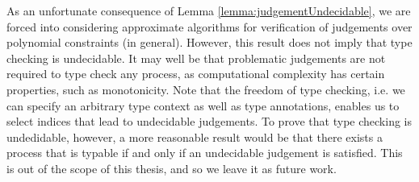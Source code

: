 As an unfortunate consequence of Lemma \ref{lemma:judgementUndecidable}, we are forced into considering approximate algorithms for verification of judgements over polynomial constraints (in general). However, this result does not imply that type checking is undecidable. It may well be that problematic judgements are not required to type check any process, as computational complexity has certain properties, such as monotonicity. Note that the freedom of type checking, i.e. we can specify an arbitrary type context as well as type annotations, enables us to select indices that lead to undecidable judgements. To prove that type checking is undedidable, however, a more reasonable result would be that there exists a process that is typable if and only if an undecidable judgement is satisfied. This is out of the scope of this thesis, and so we leave it as future work. %